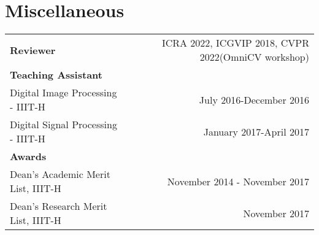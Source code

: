 \documentclass[letterpaper,11pt]{article}
\begin{document}
\section*{Miscellaneous}
\noindent
\begin{tabularx}{\textwidth}{@{}X r@{}}
\textbf{Reviewer} & ICRA 2022, ICGVIP 2018, CVPR 2022(OmniCV workshop) \\
\textbf{Teaching Assistant} & \\
Digital Image Processing - IIIT-H & July 2016-December 2016 \\
Digital Signal Processing - IIIT-H & January 2017-April 2017 \\
\textbf{Awards} & \\
Dean's Academic Merit List, IIIT-H & November 2014 - November 2017 \\
Dean's Research Merit List, IIIT-H & November 2017 \\
\end{tabularx}
\end{document}
